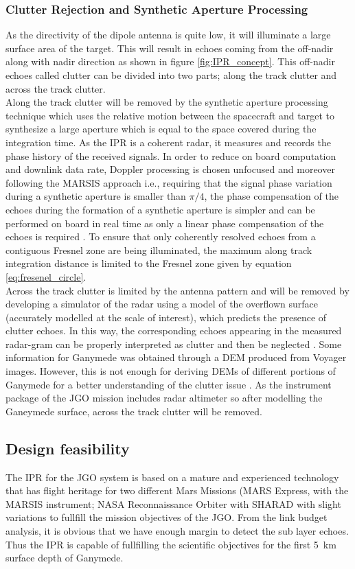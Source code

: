 \subsubsection{Clutter Rejection and Synthetic Aperture Processing}
\label{SAR}
As the directivity of the dipole antenna is quite low, it will illuminate a large surface area of the target. This will result in echoes coming from the off-nadir along with nadir direction as shown in figure \ref{fig:IPR_concept}. This off-nadir echoes called clutter can be divided into two parts; along the track clutter and across the track clutter.\\
%
Along the track clutter will be removed by the synthetic aperture processing technique which uses the relative motion between the spacecraft and target to synthesize a large aperture which is equal to the space covered during the integration time. As the \ac{IPR} is a coherent radar, it measures and records the phase history of the received signals. In order to reduce on board computation and downlink data rate, Doppler processing is chosen unfocused and moreover following the \ac{MARSIS} approach i.e., requiring that the signal phase variation during a synthetic aperture is smaller than $\pi/4$, the phase compensation of the echoes during the formation of a synthetic aperture is simpler and can be performed on board in real time as only a linear phase compensation of the echoes is required \cite{Gany_SRS}. To ensure that only coherently resolved echoes from a contiguous Fresnel zone are being illuminated, the maximum along track integration distance is limited to the Fresnel zone given by equation \ref{eq:fresenel_circle}.
\\
Across the track clutter is limited by the antenna pattern and will be removed by developing a simulator of the radar using a model of the overflown surface (accurately modelled at the scale of interest), which predicts the presence of clutter echoes. In this way, the corresponding echoes appearing in the measured radar-gram can be properly interpreted as clutter and then be neglected \cite{SHARAD}. Some information for Ganymede was obtained through a \ac{DEM} produced from Voyager images. However, this is not enough  for deriving \acp{DEM} of different portions of Ganymede for a better understanding of the clutter issue \cite{Gany_SRS}. As the instrument package of the \ac{JGO} mission includes radar altimeter so after modelling the Ganeymede surface, across the track clutter will be removed.
\subsection{Design feasibility}
The \ac{IPR} for the \ac{JGO} system is based on a mature and experienced technology that has flight heritage for two different Mars Missions (MARS Express, with the \ac{MARSIS} instrument; NASA Reconnaissance Orbiter with \ac{SHARAD} with slight variations to fullfill  the mission objectives of the \ac{JGO}. From the link budget analysis, it is obvious that we have enough margin to detect the sub layer echoes.  Thus the \ac{IPR} is capable of fullfilling the scientific objectives for the first 5~km surface depth of Ganymede.
